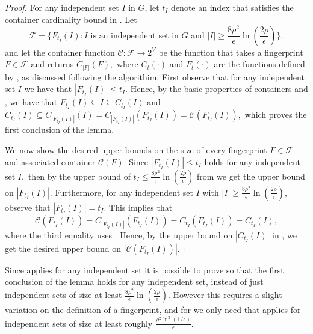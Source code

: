 \documentclass[11pt]{article}
\begin{document}
\begin{proof}
For any independent set $I$ in $G$, let $t_I$ denote an index that satisfies the container cardinality bound in . 
    Let \[ \mathcal{F}=\biggl\{F_{t_I}(I) : I \textrm{ is an independent set in } G \textrm{ and } |I| \geq \frac{8 \rho^2}{\epsilon}  \ln\left(\frac{2\rho}\epsilon\right)\biggr\},\] and let the container function $\mathcal{C}: \mathcal{F} \rightarrow 2^V$ be the function that takes a fingerprint $F \in \mathcal{F}$ and returns $C_{|F|}(F),$ where $C_t(\cdot)$ and $F_t(\cdot)$ are the functions defined by , as discussed following the algorithim.
    First observe that for any independent set $I$ we have that $|F_{t_I} (I)| \leq t_I.$
    Hence, by the basic properties of containers and , we have that $F_{t_I}(I) \subseteq I \subseteq C_{t_I}(I)$ and $C_{t_I}(I) \subseteq C_{|F_{t_I}(I)|}(I) = C_{|F_{t_I}(I)|}(F_{t_I}(I))=\mathcal{C}(F_{t_I}(I)),$ which proves the first conclusion of the lemma.
    
    We now show the desired upper bounds on the size of every fingerprint $F \in \mathcal{F}$ and associated container $\mathcal{C}(F).$
    Since $|F_{t_I} (I)| \leq t_I$ holds for any independent set $I,$ then by the upper bound of $t_I \leq \frac{8 \rho^2}{\epsilon}  \ln\left(\frac{2\rho}\epsilon\right)$ from  we get the upper bound on $|F_{t_I}(I)|.$
    Furthermore, for any independent set $I$ with $|I| \geq \frac{8 \rho^2}{\epsilon}  \ln\left(\frac{2\rho}\epsilon\right),$ observe that $|F_{t_I}(I)| = t_I.$
    This implies that \[\mathcal{C}(F_{t_I}(I)) = C_{|F_{t_I}(I)|}(F_{t_I}(I))=C_{t_I}(F_{t_I}(I))=C_{t_I}(I),\] where the third equality uses .
    Hence, by the upper bound on $|C_{t_I}(I)|$ in , we get the desired upper bound on $|\mathcal{C}(F_{t_I}(I))|.$
\end{proof}

\begin{remark}
Since  applies for any independent set it is possible to prove  so that the first conclusion of the lemma holds for any independent set, instead of just independent sets of size at least $\frac{8 \rho^2}{\epsilon}  \ln\left(\frac{2\rho}\epsilon\right).$ However this requires a slight variation on the definition of a fingerprint, and for  we only need that  applies for independent sets of size at least roughly $\frac{\rho^2 \ln^3(1/\epsilon)}{\epsilon}.$
\end{remark}
\end{document}
